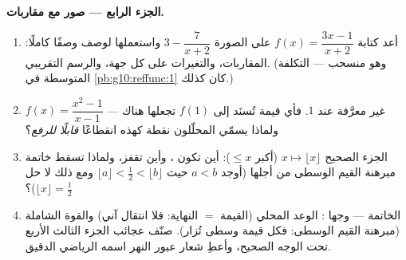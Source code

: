 \begin{problem}
\medskip
\noindent\textbf{الجزء الرابع --- صور مع مقاربات.}
\begin{enumerate}[resume]
  \item أعد كتابة $f(x) = \dfrac{3x - 1}{x + 2}$ على الصورة
        $3 - \dfrac{7}{x + 2}$ واستعملها لوصف 
        وصفًا كاملًا: المقاربات، والتغيرات على كل جهة،
        والرسم التقريبي. (وهو  منسحب ---  التكلفة المتوسطة
        في \cref{pb:g10:reffunc:1} كان كذلك.)
  \item {} $f(x) = \dfrac{x^2 - 1}{x - 1}$ غير
        معرَّفة عند $1$. فأي قيمة تُسنَد إلى $f(1)$ تجعلها
         هناك --- ولماذا يسمّي المحلّلون نقطة كهذه
        انقطاعًا \emph{قابلًا للرفع}؟
  \item {} الجزء الصحيح $x \mapsto \lfloor x \rfloor$
        (أكبر  $\leq x$): أين تكون ،
        وأين تقفز، ولماذا تسقط خاتمة مبرهنة القيم الوسطى
        من أجلها (أوجد $a < b$ حيث
        $\lfloor a \rfloor < \frac12 < \lfloor b \rfloor$ ومع ذلك
        لا حل  $\lfloor x \rfloor = \frac12$)؟
  \item الخاتمة --- وجها : الوعد المحلي
        (القيمة $=$ النهاية: فلا انتقال آني) والقوة الشاملة
        (مبرهنة القيم الوسطى: فكل قيمة وسطى تُزار). صنّف
        عجائب الجزء الثالث الأربع تحت الوجه الصحيح، وأعطِ
        شعار عبور النهر اسمه الرياضي الدقيق.
\end{enumerate}
\end{problem}
